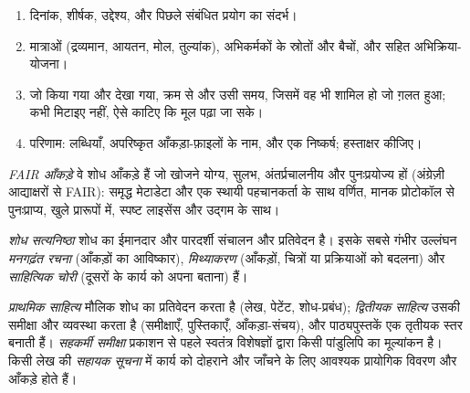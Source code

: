 \begin{method}[नोटबुक प्रविष्टि लिखना]\label{met:b3:lab-techniques-3:notebook}
\begin{enumerate}
  \item दिनांक, शीर्षक, उद्देश्य, और पिछले संबंधित प्रयोग का संदर्भ।
  \item मात्राओं (द्रव्यमान, आयतन, मोल, तुल्यांक), अभिकर्मकों के स्रोतों
        और बैचों, और  सहित अभिक्रिया-योजना।
  \item जो किया गया और देखा गया, क्रम से और उसी समय, जिसमें वह भी शामिल हो जो
        ग़लत हुआ; कभी मिटाइए नहीं, ऐसे काटिए कि मूल पढ़ा जा सके।
  \item परिणाम: लब्धियाँ, अपरिष्कृत आँकड़ा-फ़ाइलों के नाम, और एक निष्कर्ष; हस्ताक्षर कीजिए।
\end{enumerate}
\end{method}

\begin{definition}[FAIR आँकड़े]\label{def:b3:lab-techniques-3:fair}
\emph{FAIR आँकड़े} वे शोध आँकड़े हैं जो खोजने योग्य,
सुलभ, अंतर्प्रचालनीय और पुनःप्रयोज्य हों (अंग्रेज़ी आद्याक्षरों से FAIR): समृद्ध मेटाडेटा और एक
स्थायी पहचानकर्ता के साथ वर्णित, मानक प्रोटोकॉल से पुनःप्राप्य, खुले प्रारूपों में,
स्पष्ट लाइसेंस और उद्गम के साथ।
\end{definition}

\begin{definition}[शोध सत्यनिष्ठा]\label{def:b3:lab-techniques-3:integrity}
\emph{शोध सत्यनिष्ठा} शोध का ईमानदार और
पारदर्शी संचालन और प्रतिवेदन है। इसके सबसे गंभीर उल्लंघन
\emph{मनगढ़ंत रचना} (आँकड़ों का आविष्कार), \emph{मिथ्याकरण}
(आँकड़ों, चित्रों या प्रक्रियाओं को बदलना) और \emph{साहित्यिक चोरी}
(दूसरों के कार्य को अपना बताना) हैं।
\end{definition}

\begin{definition}[साहित्य]\label{def:b3:lab-techniques-3:literature}
\emph{प्राथमिक साहित्य} मौलिक
शोध का प्रतिवेदन करता है (लेख, पेटेंट, शोध-प्रबंध); \emph{द्वितीयक
साहित्य} उसकी समीक्षा और व्यवस्था करता है (समीक्षाएँ,
पुस्तिकाएँ, आँकड़ा-संचय), और पाठ्यपुस्तकें एक तृतीयक स्तर बनाती हैं। \emph{सहकर्मी
समीक्षा} प्रकाशन से पहले स्वतंत्र विशेषज्ञों द्वारा किसी पांडुलिपि का
मूल्यांकन है। किसी लेख की \emph{सहायक सूचना}
में कार्य को दोहराने और जाँचने के लिए आवश्यक प्रायोगिक विवरण और आँकड़े
होते हैं।
\end{definition}

